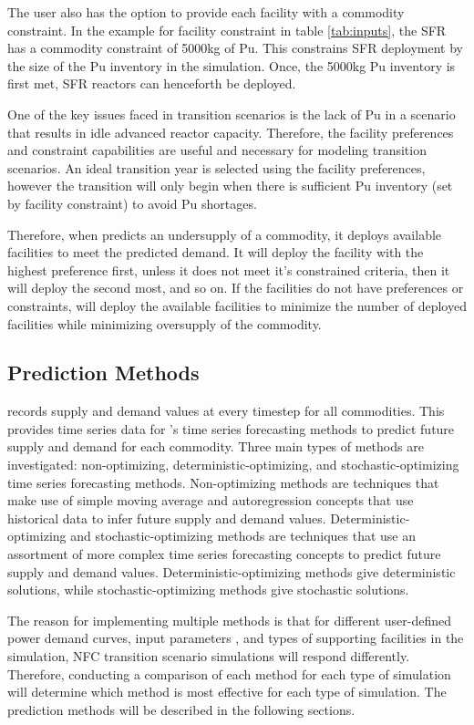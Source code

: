 The user also has the option to provide each facility with a 
commodity constraint. 
In the example for facility constraint in table \ref{tab:inputs}, 
the \gls{SFR} has a commodity constraint of 5000kg of Pu. 
This constrains \gls{SFR} deployment by the size of the Pu inventory 
in the simulation. 
Once, the 5000kg Pu inventory is first met, \gls{SFR} reactors can 
henceforth be deployed. 

One of the key issues faced in transition scenarios is the lack 
of Pu in a scenario that results in idle advanced reactor capacity. 
Therefore, the facility preferences and constraint capabilities 
are useful and necessary for modeling transition scenarios. 
An ideal transition year is selected using the facility 
preferences, however the transition will only begin when there 
is sufficient Pu inventory (set by facility constraint) 
to avoid Pu shortages. 

Therefore, when \deploy predicts an undersupply of a commodity, 
it deploys available facilities to meet the predicted demand. 
It will deploy the facility with the highest preference first, 
unless it does not meet it's constrained criteria, then it will 
deploy the second most, and so on. 
If the facilities do not have preferences or constraints, \deploy 
will deploy the available facilities to minimize the number of 
deployed facilities while minimizing oversupply of the commodity.

\subsection{Prediction Methods}
\deploy records supply and demand values at every timestep for all 
commodities. 
This provides time series data for \deploy's time series 
forecasting methods to predict future supply and demand for each 
commodity.  
Three main types of methods are investigated: non-optimizing, 
deterministic-optimizing, and stochastic-optimizing
time series forecasting methods.
Non-optimizing methods are techniques that make use of 
simple moving average and autoregression concepts that use 
historical data to infer future supply and demand values. 
Deterministic-optimizing and stochastic-optimizing 
methods are techniques 
that use an assortment of more complex time series forecasting 
concepts to predict future supply and demand values. 
Deterministic-optimizing methods give deterministic solutions,
while stochastic-optimizing methods give stochastic solutions. 

The reason for implementing multiple methods is that for different 
user-defined power demand curves, \deploy input parameters
, and types of supporting facilities in the simulation,
\gls{NFC} transition scenario simulations will respond differently. 
Therefore, conducting a comparison of each method for each type of 
simulation will determine which method is most effective for 
each type of simulation. 
The prediction methods will be described in the following 
sections. 

